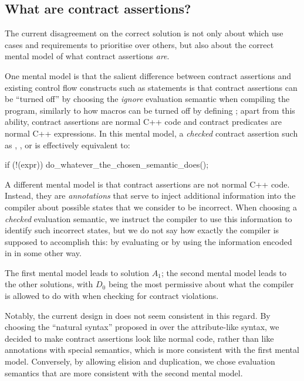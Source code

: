 \subsection{What are contract assertions?}

The current disagreement on the correct solution is  not only about which use cases and requirements to prioritise over others, but also about the correct mental model of what contract assertions \emph{are}.

One mental model is that the salient difference between contract assertions and existing control flow constructs such as  statements is that contract assertions can be ``turned off'' by choosing the \emph{ignore} evaluation semantic when compiling the program, similarly to how  macros can be turned off by defining ; apart from this ability, contract assertions are normal C++ code and contract predicates are normal C++ expressions. In this mental model, a \emph{checked} contract assertion such as , , or  is effectively equivalent to:
\begin{codeblock}
if (!(expr))
  do_whatever_the_chosen_semantic_does();
\end{codeblock}

A different mental model is that contract assertions are not normal C++ code. Instead, they are \emph{annotations} that serve to inject additional information into the compiler about possible states that we consider to be incorrect. When choosing a \emph{checked} evaluation semantic, we instruct the compiler to use this information to identify such incorrect states, but we do not say how exactly the compiler is supposed to accomplish this: by evaluating  or by using the information encoded in  in some other way.

The first mental model leads to solution $A_1$; the second mental model leads to the other solutions, with $D_0$ being the most permissive about what the compiler is allowed to do with  when checking for contract violations.

Notably, the current design in \cite{P2900R6} does not seem consistent in this regard. By choosing the ``natural syntax'' proposed in \cite{P2961R2} over the attribute-like syntax, we decided to make contract assertions look like normal code, rather than like annotations with special semantics, which is more consistent with the first mental model. Conversely, by allowing elision and duplication, we chose evaluation semantics that are more consistent with the second mental model.

